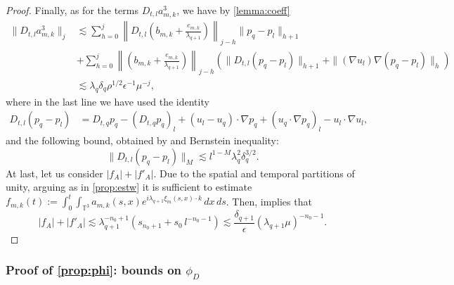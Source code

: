 \documentclass[10pt,a4paper]{amsart}
\numberwithin{equation}{section}
\numberwithin{corollario}{section}
\numberwithin{lemma}{section}
\numberwithin{prop}{section}
\theoremstyle{definition}
\theoremstyle{remark}
\newcommand{\T}{\mathbb{T}}
\newcommand{\qq}{_{q+1}}
\begin{document}
\begin{proof}
Finally, as for the terms $D_{t,l}a_{m,k}^3$, we have by \autoref{lemma:coeff}
\begin{align}
    \|D_{t,l}a_{m,k}^3\|_j
    &\lesssim \sum_{h=0}^j \left\|D_{t,l}\left(b_{m,k}+\frac{e_{m,k}}{\lambda\qq}\right)\right\|_{j-h}\|p_q-p_l\|_{h+1}\\
    &+ \sum_{h=0}^j
    \left\|\left(b_{m,k}+\frac{e_{m,k}}{\lambda\qq}\right)\right\|_{j-h}
    \left(\|D_{t,l}(p_q-p_l)\|_{h+1}+\|(\nabla u_l)\nabla(p_q-p_l)\|_h\right)
    \\
    &\lesssim \lambda_q\delta_q\rho^{1/2}\epsilon^{-1}\mu^{-j},
\end{align}
where in the last line we have used the identity
\begin{align}
    D_{t,l}(p_q-p_l)&=D_{t,q}p_q-(D_{t,q}p_q)_l+(u_l-u_q)\cdot \nabla p_q+(u_q\cdot \nabla p_q)_l-u_l\cdot \nabla u_l,
\end{align}
and the following bound, obtained by \cite[Lemma A.3]{DLK23} and Bernstein inequality:
\begin{equation}\label{est:a3first}
    \|D_{t,l}(p_q-p_l)\|_M\lesssim l^{1-M}\lambda_q^2\delta_q^{3/2}.
\end{equation}
At last, let us consider $|f_A|+|f'_A|$. Due to the spatial and temporal partitions of unity, arguing as in \autoref{prop:estw} it is sufficient to estimate $f_{m,k}(t):=\int_0^t\int_{\T^3}a_{m,k}(s,x)e^{i\lambda\qq\xi_m(s,x)\cdot k}\,dx\,ds$. Then, \cite[Lemma A.2]{DLK23} implies that 
\begin{equation}
   |f_A|+|f'_A|\lesssim \lambda\qq^{-n_0+1}(s_{n_0+1}+s_0\,l^{-n_0-1})\lesssim\frac{\delta\qq}{\epsilon}(\lambda\qq \mu)^{-n_0-1}. 
\end{equation}
\end{proof}

\subsubsection{Proof of \autoref{prop:phi}: bounds on $\phi_D$}
\end{document}
